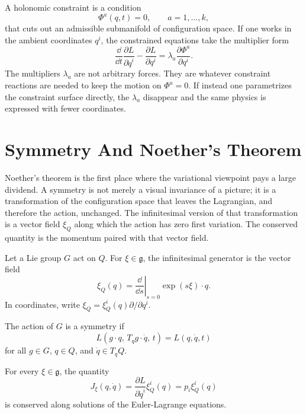 A holonomic constraint is a condition
\[
  \Phi^a(q,t)=0,\qquad a=1,\ldots,k,
\]
that cuts out an admissible submanifold of configuration space. If one works in
the ambient coordinates \(q^i\), the constrained equations take the multiplier
form
\[
  \frac{\dd}{\dd t}\frac{\partial L}{\partial \dot q^i}
  -
  \frac{\partial L}{\partial q^i}
  =
  \lambda_a\frac{\partial \Phi^a}{\partial q^i}.
\]
The multipliers \(\lambda_a\) are not arbitrary forces. They are whatever
constraint reactions are needed to keep the motion on \(\Phi^a=0\). If instead
one parametrizes the constraint surface directly, the \(\lambda_a\) disappear
and the same physics is expressed with fewer coordinates.

\section{Symmetry And Noether's Theorem}
\label{sec:noether}

Noether's theorem is the first place where the variational viewpoint pays a
large dividend. A symmetry is not merely a visual invariance of a picture; it
is a transformation of the configuration space that leaves the Lagrangian, and
therefore the action, unchanged. The infinitesimal version of that
transformation is a vector field \(\xi_Q\) along which the action has zero
first variation. The conserved quantity is the momentum paired with that vector
field.

\begin{definition}
Let a Lie group \(G\) act on \(Q\). For \(\xi\in\mathfrak g\), the infinitesimal
generator is the vector field
\[
  \xi_Q(q)=\left.\frac{\dd}{\dd s}\right|_{s=0}\exp(s\xi)\cdot q.
\]
In coordinates, write \(\xi_Q=\xi_Q^i(q)\partial/\partial q^i\).
\end{definition}

\begin{assumption}
The action of \(G\) is a symmetry if
\[
  L(g\cdot q,\,T_qg\cdot \dot q,\,t)=L(q,\dot q,t)
\]
for all \(g\in G\), \(q\in Q\), and \(\dot q\in T_qQ\).
\end{assumption}

\begin{proposition}
For every \(\xi\in\mathfrak g\), the quantity
\[
  J_\xi(q,\dot q)
  =
  \frac{\partial L}{\partial \dot q^i}\xi_Q^i(q)
  =
  p_i\xi_Q^i(q)
\]
is conserved along solutions of the Euler-Lagrange equations.
\end{proposition}

